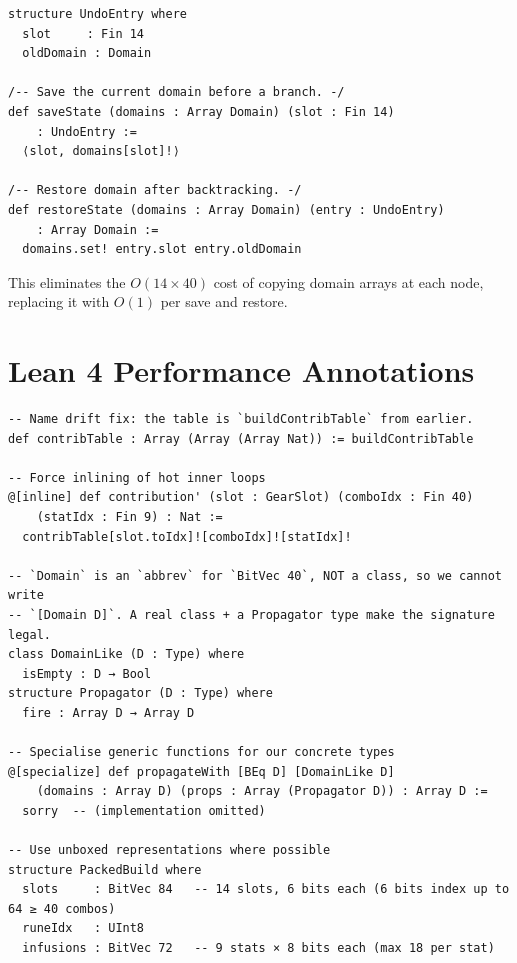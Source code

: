\documentclass[11pt, a4paper, oneside]{book}
\begin{document}
\begin{leanbox}[title={Lean 4 --- Undo Stack}]
\begin{verbatim}
structure UndoEntry where
  slot     : Fin 14
  oldDomain : Domain

/-- Save the current domain before a branch. -/
def saveState (domains : Array Domain) (slot : Fin 14)
    : UndoEntry :=
  ⟨slot, domains[slot]!⟩

/-- Restore domain after backtracking. -/
def restoreState (domains : Array Domain) (entry : UndoEntry)
    : Array Domain :=
  domains.set! entry.slot entry.oldDomain
\end{verbatim}
\end{leanbox}

This eliminates the $O(14 \times 40)$ cost of copying domain arrays at each
node, replacing it with $O(1)$ per save and restore.

\section{Lean 4 Performance Annotations}

\begin{leanbox}[title={Lean 4 --- Compiler Hints}]
\begin{verbatim}
-- Name drift fix: the table is `buildContribTable` from earlier.
def contribTable : Array (Array (Array Nat)) := buildContribTable

-- Force inlining of hot inner loops
@[inline] def contribution' (slot : GearSlot) (comboIdx : Fin 40)
    (statIdx : Fin 9) : Nat :=
  contribTable[slot.toIdx]![comboIdx]![statIdx]!

-- `Domain` is an `abbrev` for `BitVec 40`, NOT a class, so we cannot write
-- `[Domain D]`. A real class + a Propagator type make the signature legal.
class DomainLike (D : Type) where
  isEmpty : D → Bool
structure Propagator (D : Type) where
  fire : Array D → Array D

-- Specialise generic functions for our concrete types
@[specialize] def propagateWith [BEq D] [DomainLike D]
    (domains : Array D) (props : Array (Propagator D)) : Array D :=
  sorry  -- (implementation omitted)

-- Use unboxed representations where possible
structure PackedBuild where
  slots     : BitVec 84   -- 14 slots, 6 bits each (6 bits index up to 64 ≥ 40 combos)
  runeIdx   : UInt8
  infusions : BitVec 72   -- 9 stats × 8 bits each (max 18 per stat)
\end{verbatim}
\end{leanbox}
\end{document}
